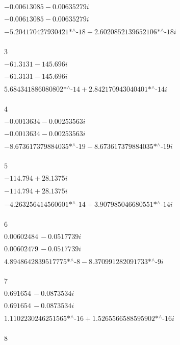 \noindent\(-0.00613085-0.00635279 i\)

\noindent\(-0.00613085-0.00635279 i\)

\noindent\(-\text{5.204170427930421$\grave{ }$*${}^{\wedge}$-18}+\text{2.6020852139652106$\grave{ }$*${}^{\wedge}$-18} i\)

\noindent\(\text{}\)

\noindent\(3\)

\noindent\(-61.3131-145.696 i\)

\noindent\(-61.3131-145.696 i\)

\noindent\(\text{5.684341886080802$\grave{ }$*${}^{\wedge}$-14}+\text{2.842170943040401$\grave{ }$*${}^{\wedge}$-14} i\)

\noindent\(\text{}\)

\noindent\(4\)

\noindent\(-0.0013634-0.00253563 i\)

\noindent\(-0.0013634-0.00253563 i\)

\noindent\(-\text{8.673617379884035$\grave{ }$*${}^{\wedge}$-19}-\text{8.673617379884035$\grave{ }$*${}^{\wedge}$-19} i\)

\noindent\(\text{}\)

\noindent\(5\)

\noindent\(-114.794+28.1375 i\)

\noindent\(-114.794+28.1375 i\)

\noindent\(-\text{4.263256414560601$\grave{ }$*${}^{\wedge}$-14}+\text{3.907985046680551$\grave{ }$*${}^{\wedge}$-14} i\)

\noindent\(\text{}\)

\noindent\(6\)

\noindent\(0.00602484\, -0.0517739 i\)

\noindent\(0.00602479\, -0.0517739 i\)

\noindent\(\text{4.8948642839517775$\grave{ }$*${}^{\wedge}$-8}-\text{8.370991282091733$\grave{ }$*${}^{\wedge}$-9} i\)

\noindent\(\text{}\)

\noindent\(7\)

\noindent\(0.691654\, -0.0873534 i\)

\noindent\(0.691654\, -0.0873534 i\)

\noindent\(\text{1.1102230246251565$\grave{ }$*${}^{\wedge}$-16}+\text{1.5265566588595902$\grave{ }$*${}^{\wedge}$-16} i\)

\noindent\(\text{}\)

\noindent\(8\)

